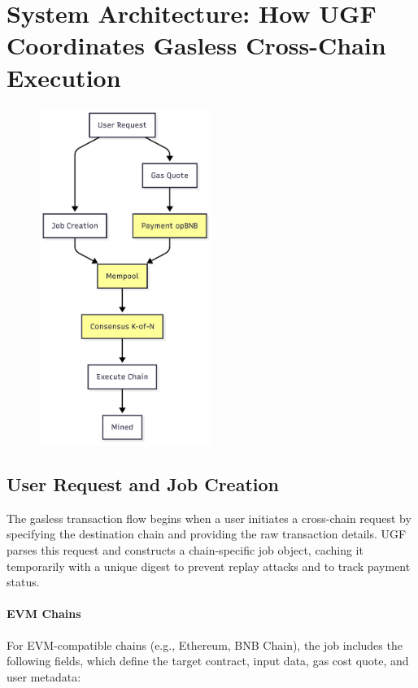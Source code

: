 \documentclass{article}
\begin{document}
\section*{System Architecture: How UGF Coordinates Gasless Cross-Chain Execution}


\begin{figure}[H]
 \begin{center}
 \includegraphics[width=0.5\textwidth]{images/full-flow.png}
  \end{center}

\end{figure}

\subsection{User Request and Job Creation}
The gasless transaction flow begins when a user initiates a cross-chain request by specifying the destination chain and providing the raw transaction details. UGF parses this request and constructs a chain-specific job object, caching it temporarily with a unique digest to prevent replay attacks and to track payment status.

\paragraph{EVM Chains}
For EVM-compatible chains (e.g., Ethereum, BNB Chain), the job includes the following fields, which define the target contract, input data, gas cost quote, and user metadata:
\end{document}
